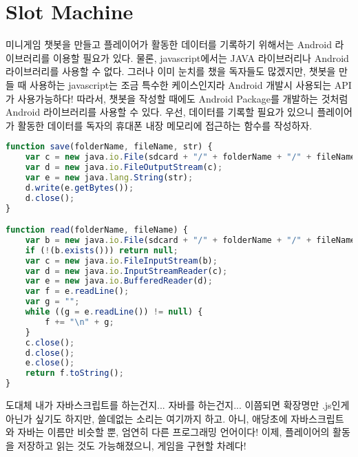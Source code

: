 \documentclass[10pt,b6paper,final]{book}
\begin{document}
\section{Slot Machine}
미니게임 챗봇을 만들고 플레이어가 활동한 데이터를 기록하기 위해서는 Android 라이브러리를
이용할 필요가 있다. 물론, javascript에서는 JAVA 라이브러리나 Android 라이브러리를 사용할 수 없다.
그러나 이미 눈치를 챘을 독자들도 많겠지만, 챗봇을 만들 때 사용하는 javascript는 조금 특수한 케이스인지라
Android 개발시 사용되는 API가 사용가능하다! 따라서, 챗봇을 작성할 때에도 Android Package를 개발하는 것처럼
Android 라이브러리를 사용할 수 있다.
우선, 데이터를 기록할 필요가 있으니 플레이어가 활동한 데이터를 독자의 휴대폰 내장 메모리에 접근하는 함수를 작성하자.
\begin{lstlisting}[language=JavaScript,escapeinside=@@]
function save(folderName, fileName, str) {
    var c = new java.io.File(sdcard + "/" + folderName + "/" + fileName);
    var d = new java.io.FileOutputStream(c);
    var e = new java.lang.String(str);
    d.write(e.getBytes());
    d.close();
}

function read(folderName, fileName) {
    var b = new java.io.File(sdcard + "/" + folderName + "/" + fileName);
    if (!(b.exists())) return null;
    var c = new java.io.FileInputStream(b);
    var d = new java.io.InputStreamReader(c);
    var e = new java.io.BufferedReader(d);
    var f = e.readLine();
    var g = "";
    while ((g = e.readLine()) != null) {
        f += "\n" + g;
    }
    c.close();
    d.close();
    e.close();
    return f.toString();
}
\end{lstlisting}
도대체 내가 자바스크립트를 하는건지... 자바를 하는건지... 이쯤되면 확장명만 .js인게 아닌가 싶기도 하지만,
쓸데없는 소리는 여기까지 하고. 아니, 애당초에 자바스크립트와 자바는 이름만 비슷할 뿐, 엄연히 다른 프로그래밍 언어이다!
이제, 플레이어의 활동을 저장하고 읽는 것도 가능해졌으니, 게임을 구현할 차례다!
\end{document}
